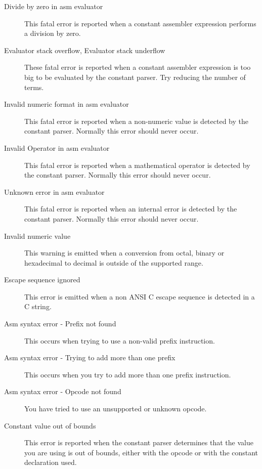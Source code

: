 \begin{description}
\item [Divide by zero in asm evaluator]
This fatal error is reported when a constant assembler expression
performs a division by zero.

\item [Evaluator stack overflow, Evaluator stack underflow]
These fatal error is reported when a constant assembler expression
is too big to be evaluated by the constant parser. Try reducing the
number of terms.

\item [Invalid numeric format in asm evaluator]
This fatal error is reported when a non-numeric value is detected
by the constant parser. Normally this error should never occur.

\item [Invalid Operator in asm evaluator]
This fatal error is reported when a mathematical operator is detected
by the constant parser. Normally this error should never occur.

\item [Unknown error in asm evaluator]
This fatal error is reported when an internal error is detected
by the constant parser. Normally this error should never occur.

\item [Invalid numeric value]
This warning is emitted when a conversion from octal, binary
or hexadecimal to decimal is outside of the supported range.

\item [Escape sequence ignored]
This error is emitted when a non ANSI C escape sequence is detected in
a C string.

\item [Asm syntax error - Prefix not found]
This occurs when trying to use a non-valid prefix instruction.

\item [Asm syntax error - Trying to add more than one prefix]
This occurs when you try to add more than one prefix instruction.

\item [Asm syntax error - Opcode not found]
You have tried to use an unsupported or unknown opcode.

\item [Constant value out of bounds]
This error is reported when the constant parser determines that the
value you are using is out of bounds, either with the opcode or with
the constant declaration used.


\end{description}
